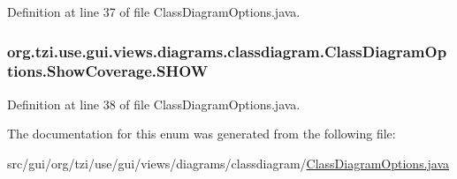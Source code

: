 Definition at line 37 of file Class\-Diagram\-Options.\-java.

\hypertarget{enumorg_1_1tzi_1_1use_1_1gui_1_1views_1_1diagrams_1_1classdiagram_1_1_class_diagram_options_1_1_show_coverage_a14f7296cc22c5ce15cef0c7ee5d95530}{
\subsubsection[{S\-H\-O\-W}]{\setlength{\rightskip}{0pt plus 5cm}org.\-tzi.\-use.\-gui.\-views.\-diagrams.\-classdiagram.\-Class\-Diagram\-Options.\-Show\-Coverage.\-S\-H\-O\-W}}\label{enumorg_1_1tzi_1_1use_1_1gui_1_1views_1_1diagrams_1_1classdiagram_1_1_class_diagram_options_1_1_show_coverage_a14f7296cc22c5ce15cef0c7ee5d95530}


Definition at line 38 of file Class\-Diagram\-Options.\-java.



The documentation for this enum was generated from the following file\-:\begin{DoxyCompactItemize}
\item 
src/gui/org/tzi/use/gui/views/diagrams/classdiagram/\hyperlink{_class_diagram_options_8java}{Class\-Diagram\-Options.\-java}\end{DoxyCompactItemize}
